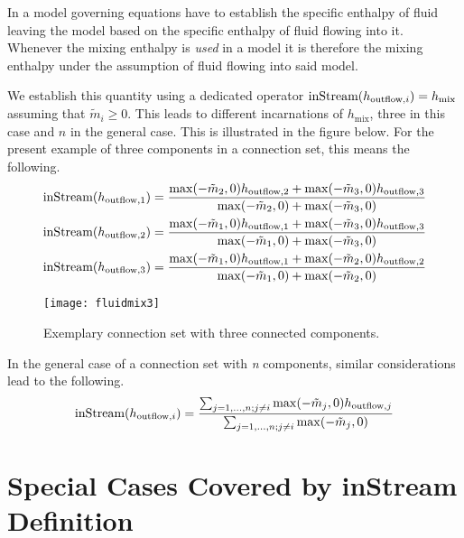 In a model governing equations have to establish the specific enthalpy of fluid leaving the model based on the specific enthalpy of fluid flowing into it.
Whenever the mixing enthalpy is \emph{used} in a model it is therefore the mixing enthalpy under the assumption of fluid flowing into said model.

We establish this quantity using a dedicated operator $\text{\lstinline!inStream!}(h_{\mathrm{outflow},i})=h_{\mathrm{mix}}$ assuming that $\tilde{m}_{i} \geq 0$.
This leads to different incarnations of $h_{\mathrm{mix}}$, three in this case and $n$ in the general case.
This is illustrated in the figure below.
For the present example of three components in a connection set, this means the following.
\begin{align*}
\text{\lstinline!inStream!}(h_{\mathrm{outflow},1}) &= \frac{\operatorname{max}(-\tilde{m}_2,0)h_{\mathrm{outflow},2}+\operatorname{max}(-\tilde{m}_3,0)h_{\mathrm{outflow},3}}{\operatorname{max}(-\tilde{m}_2,0)+\operatorname{max}(-\tilde{m}_3,0)}\\
\text{\lstinline!inStream!}(h_{\mathrm{outflow},2}) &= \frac{\operatorname{max}(-\tilde{m}_1,0)h_{\mathrm{outflow},1}+\operatorname{max}(-\tilde{m}_3,0)h_{\mathrm{outflow},3}}{\operatorname{max}(-\tilde{m}_1,0)+\operatorname{max}(-\tilde{m}_3,0)}\\
\text{\lstinline!inStream!}(h_{\mathrm{outflow},3}) &= \frac{\operatorname{max}(-\tilde{m}_1,0)h_{\mathrm{outflow},1}+\operatorname{max}(-\tilde{m}_2,0)h_{\mathrm{outflow},2}}{\operatorname{max}(-\tilde{m}_1,0)+\operatorname{max}(-\tilde{m}_2,0)}
\end{align*}
\begin{figure}[H]
  \begin{center}
    \texttt{[image: fluidmix3]}
  \end{center}
  \caption{%
    Exemplary connection set with three connected components.
  }
\end{figure}

In the general case of a connection set with \emph{n} components, similar considerations lead to the following.
\begin{equation*}
\text{\lstinline!inStream!}(h_{\mathrm{outflow},i})=\frac{\sum_{j=1,\dotsc,n;j\neq i}\operatorname{max}(-\tilde{m}_j,0)h_{\mathrm{outflow},j}}{\sum_{j=1,\dotsc,n;j\neq i}\operatorname{max}(-\tilde{m}_j,0)}
\end{equation*}

\section{Special Cases Covered by inStream Definition}\label{special-cases-covered-by-the-instream-operator-definition}

